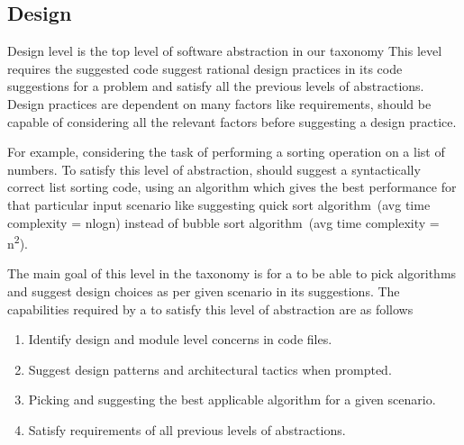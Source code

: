 \subsection{Design}
\label{design}
Design level is the top level of software abstraction in our taxonomy This level requires the suggested code suggest rational design practices in its code suggestions for a problem and satisfy all the previous levels of abstractions. Design practices are dependent on many factors like requirements, \cct{} should be capable of considering all the relevant factors before suggesting a design practice.

For example, considering the task of performing a sorting operation on a list of numbers. To satisfy this level of abstraction, \cct{} should suggest a syntactically correct list sorting code, using an algorithm which gives the best performance for that particular input scenario like suggesting quick sort algorithm~(avg time complexity = nlogn) instead of bubble sort algorithm~(avg time complexity = n\textsuperscript{2}).

The main goal of this level in the taxonomy is for a \cct{} to be able to pick algorithms and suggest design choices as per given scenario in its suggestions.
The capabilities required by a \cct{} to satisfy this level of abstraction are as follows
\begin{enumerate}
    \item Identify design and module level concerns in code files.
    \item Suggest design patterns and architectural tactics when prompted.
    \item Picking and suggesting the best applicable algorithm for a given scenario.
    \item Satisfy requirements of all previous levels of abstractions.
\end{enumerate}

